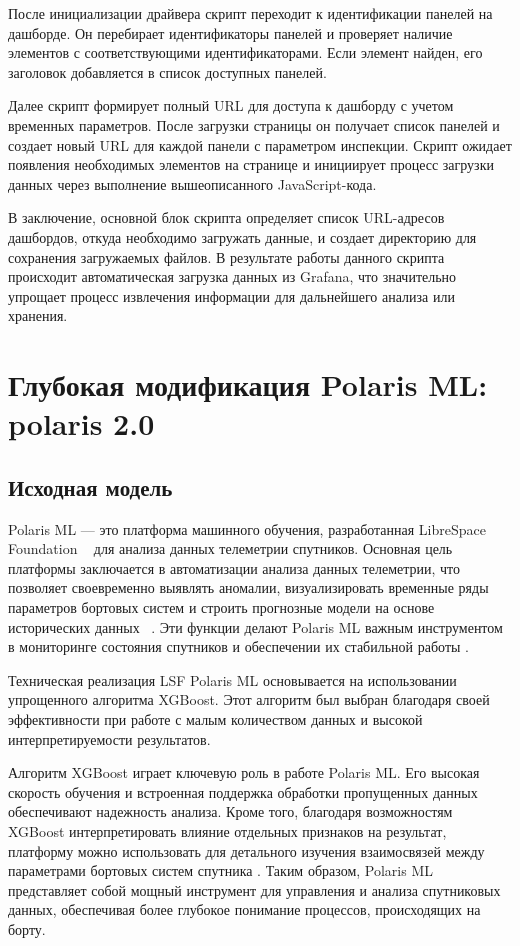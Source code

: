 \documentclass[14pt, a4paper]{src/bsu}
\begin{document}
После инициализации драйвера скрипт переходит к идентификации панелей на
дашборде. Он перебирает идентификаторы панелей и проверяет наличие
элементов с соответствующими идентификаторами. Если элемент найден, его
заголовок добавляется в список доступных панелей.

Далее скрипт формирует полный URL для доступа к дашборду с учетом временных
параметров. После загрузки страницы он получает список панелей и создает
новый URL для каждой панели с параметром инспекции. Скрипт ожидает
появления необходимых элементов на странице и инициирует процесс загрузки
данных через выполнение вышеописанного JavaScript-кода.

В заключение, основной блок скрипта определяет список URL-адресов
дашбордов, откуда необходимо загружать данные, и создает директорию для
сохранения загружаемых файлов. В результате работы данного скрипта
происходит автоматическая загрузка данных из Grafana, что значительно
упрощает процесс извлечения информации для дальнейшего анализа или
хранения.


\newpage

\chapter{Глубокая модификация Polaris ML: polaris 2.0}

\section{Исходная модель}

Polaris ML — это платформа машинного обучения, разработанная LibreSpace
Foundation ~\cite{librespace_docs} для анализа данных телеметрии спутников.
Основная цель платформы заключается в автоматизации анализа данных телеметрии,
что позволяет своевременно выявлять аномалии, визуализировать временные ряды
параметров бортовых систем и строить прогнозные модели на основе исторических
данных ~\cite{ray_2002_bayesian}. Эти функции делают Polaris ML важным
инструментом в мониторинге состояния спутников и обеспечении их стабильной
работы \cite{polaris_ml_docs}.

Техническая реализация LSF Polaris ML основывается на использовании упрощенного
алгоритма XGBoost. Этот алгоритм был выбран благодаря своей эффективности при
работе с малым количеством данных и высокой интерпретируемости результатов.

Алгоритм XGBoost играет ключевую роль в работе Polaris ML. Его высокая скорость
обучения и встроенная поддержка обработки пропущенных данных обеспечивают
надежность анализа. Кроме того, благодаря возможностям XGBoost интерпретировать
влияние отдельных признаков на результат, платформу можно использовать для
детального изучения взаимосвязей между параметрами бортовых систем спутника
\cite{xgboost_docs}. Таким образом, Polaris ML представляет собой мощный
инструмент для управления и анализа спутниковых данных, обеспечивая более
глубокое понимание процессов, происходящих на борту.
\end{document}

